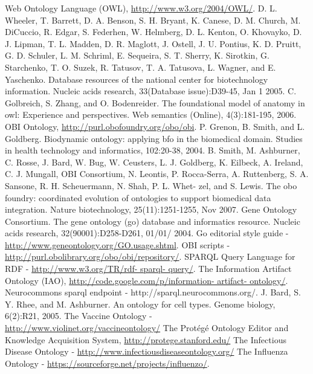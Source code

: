 \documentclass{ao2e}%
\begin{document}
\begin{thebibliography}{}
 Web Ontology Language (OWL), \url{http://www.w3.org/2004/OWL/}.
 D. L. Wheeler, T. Barrett, D. A. Benson, S. H. Bryant, K. Canese, D. M. Church, M. DiCuccio, R. Edgar, S. Federhen, 
W. Helmberg, D. L. Kenton, O. Khovayko, D. J. Lipman, T. L. Madden, D. R. Maglott, J. Ostell, J. U. Pontius, K. D. Pruitt, 
G. D. Schuler, L. M. Schriml, E. Sequeira, S. T. Sherry, K. Sirotkin, G. Starchenko, T. O. Suzek, R. Tatusov, T. A. Tatusova, 
L. Wagner, and E. Yaschenko. Database resources of the national center for biotechnology information. Nucleic acids 
research, 33(Database issue):D39-45, Jan 1 2005.
 C. Golbreich, S. Zhang, and O. Bodenreider. The foundational model of anatomy in owl: Experience and perspectives. Web 
semantics (Online), 4(3):181-195, 2006. 
 OBI Ontology, \url{http://purl.obofoundry.org/obo/obi}.
 P. Grenon, B. Smith, and L. Goldberg. Biodynamic ontology: applying bfo in the biomedical domain. Studies in health 
technology and informatics, 102:20-38, 2004. 
 B. Smith, M. Ashburner, C. Rosse, J. Bard, W. Bug, W. Ceusters, L. J. Goldberg, K. Eilbeck, A. Ireland, C. J. Mungall, 
OBI Consortium, N. Leontis, P. Rocca-Serra, A. Ruttenberg, S. A. Sansone, R. H. Scheuermann, N. Shah, P. L. Whet- 
zel, and S. Lewis. The obo foundry: coordinated evolution of ontologies to support biomedical data integration. Nature 
biotechnology, 25(11):1251-1255, Nov 2007. 
 Gene Ontology Consortium. The gene ontology (go) database and informatics resource. Nucleic acids research, 
32(90001):D258-D261, 01/01/ 2004. 
 Go editorial style guide - \url{http://www.geneontology.org/GO.usage.shtml}.
 OBI scripts -  \url{http://purl.obolibrary.org/obo/obi/repository/}.
 SPARQL Query Language for RDF - \url{http://www.w3.org/TR/rdf- sparql- query/}. 
 The Information Artifact Ontology (IAO), \url{http://code.google.com/p/information- artifact- ontology/}.
 Neurocommons sparql endpoint - http://sparql.neurocommons.org/. 
 J. Bard, S. Y. Rhee, and M. Ashburner. An ontology for cell types. Genome biology, 6(2):R21, 2005. 
 The Vaccine Ontology - \url{http://www.violinet.org/vaccineontology/}
 The Prot\'{e}g\'{e} Ontology Editor and Knowledge Acquisition System, \url{http://protege.stanford.edu/}
 The Infectious Disease Ontology - \url{http://www.infectiousdiseaseontology.org/}
 The Influenza Ontology - \url{https://sourceforge.net/projects/influenzo/}.

\end{thebibliography}
\end{document}
